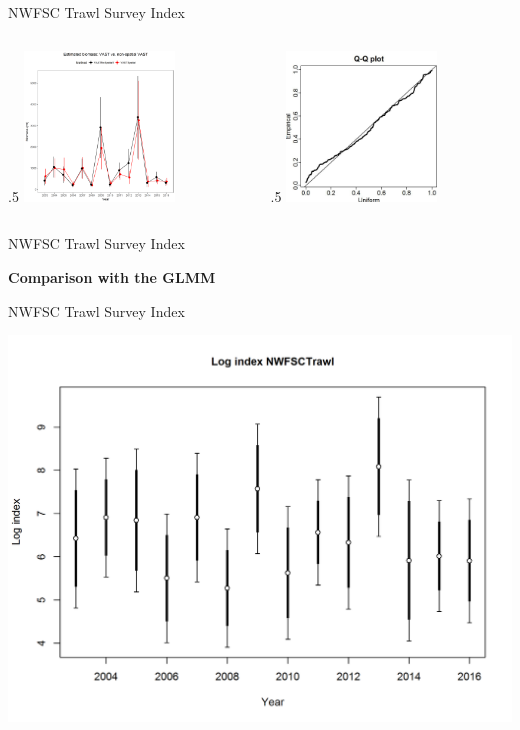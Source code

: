 \documentclass[ignorenonframetext,]{beamer}
\def\begincols{\begin{columns}}
\def\begincol{\begin{column}}
\def\endcol{\end{column}}
\def\endcols{\end{columns}}
\begin{document}
\begin{frame}{NWFSC Trawl Survey Index}

\begincols
 \begincol{.5\textwidth}
\includegraphics[height=4cm]{Figures/Fleet8_NWFSCtrawl_CompareVAST.png}
\endcol
 \begincol{.5\textwidth}
\includegraphics[height=4cm]{Figures/NWFSCtrawl_QQ.jpg}

\endcol
\endcols

\end{frame}

\begin{frame}{NWFSC Trawl Survey Index}

\textbf{Comparison with the GLMM}

\end{frame}

\begin{frame}{NWFSC Trawl Survey Index}

\centering
\includegraphics{r4ss/plots_mod1/index4_logcpuedata_NWFSCtrawl.png}

\end{frame}
\end{document}
